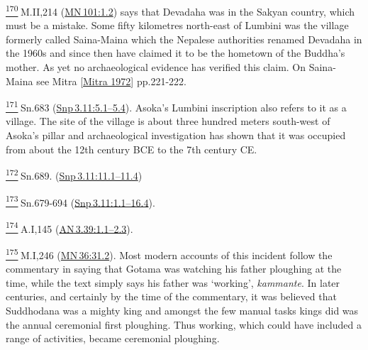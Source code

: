 \label{footprints_split_024.html_fn170}
\hyperref[footprints_split_008.htmlux5cux23fnref170]{\textsuperscript{170}} M.II,214
(\href{https://suttacentral.net/mn101/en/sujato\#1.2}{MN\,101:1.2}) says
that Devadaha was in the Sakyan country, which must be a mistake. Some
fifty kilometres north-east of Lumbini was the village formerly called
Saina-Maina which the Nepalese authorities renamed Devadaha in the 1960s
and since then have claimed it to be the hometown of the Buddha's
mother. As yet no archaeological evidence has verified this claim. On
Saina-Maina see {Mitra
{{[}\hyperref[footprints_split_022.htmlux5cux23Mitraux5cux25201972]{Mitra
1972}{]}}} pp.221-222.

\label{footprints_split_024.html_fn171}
\hyperref[footprints_split_008.htmlux5cux23fnref171]{\textsuperscript{171}} Sn.683
(\href{https://suttacentral.net/snp3.11/en/sujato\#5.1}{Snp\,3.11:5.1--5.4}).
Asoka's Lumbini inscription also refers to it as a village. The site of
the village is about three hundred meters south-west of Asoka's pillar
and archaeological investigation has shown that it was occupied from
about the 12{th} century BCE to the 7{th} century CE.

\label{footprints_split_024.html_fn172}
\hyperref[footprints_split_008.htmlux5cux23fnref172]{\textsuperscript{172}} Sn.689.
(\href{https://suttacentral.net/snp3.11/en/sujato\#11.1}{Snp\,3.11:11.1--11.4})

\label{footprints_split_024.html_fn173}
\hyperref[footprints_split_008.htmlux5cux23fnref173]{\textsuperscript{173}} Sn.679-694
(\href{https://suttacentral.net/snp3.11/en/sujato\#1.1}{Snp\,3.11:1.1--16.4}).

\label{footprints_split_024.html_fn174}
\hyperref[footprints_split_009.htmlux5cux23fnref174]{\textsuperscript{174}} A.I,145
(\href{https://suttacentral.net/an3.39/en/sujato\#1.1}{AN\,3.39:1.1--2.3}).

\label{footprints_split_024.html_fn175}
\hyperref[footprints_split_009.htmlux5cux23fnref175]{\textsuperscript{175}} M.I,246
(\href{https://suttacentral.net/mn36/en/sujato\#31.2}{MN\,36:31.2}).
Most modern accounts of this incident follow the commentary in saying
that Gotama was watching his father ploughing at the time, while the
text simply says his father was `working', \emph{kammante}. In later
centuries, and certainly by the time of the commentary, it was believed
that Suddhodana was a mighty king and amongst the few manual tasks kings
did was the annual ceremonial first ploughing. Thus working, which could
have included a range of activities, became ceremonial ploughing.

